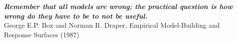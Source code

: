 \thispagestyle{empty}
\hbox{} \vfill
\begin{flushright}
\small \textit{\textbf{Remember that all models are wrong; the practical question is how wrong do they have to be to not be useful.}}
\\ \vspace{2mm}  
\scriptsize George E.P. Box and Norman R. Draper, Empirical Model-Building and Response Surfaces (1987)
\end{flushright}

\clearpage
\thispagestyle{empty}
\cleardoublepage